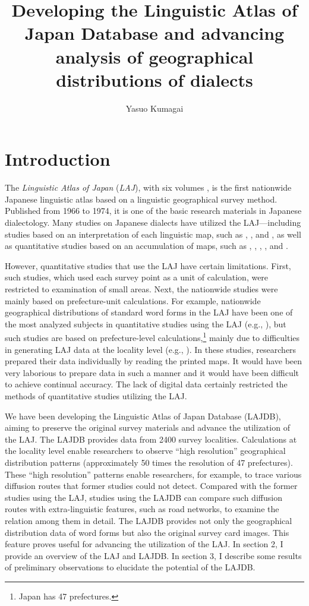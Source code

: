 \documentclass[output=paper]{LSP/langsci}
\author{Yasuo Kumagai\affiliation{National Institute for Japanese Language and Linguistics, NINJAL} }
\title{Developing the Linguistic Atlas of Japan Database and advancing analysis of geographical distributions of dialects}
\begin{document}
  




% 
 

\section{Introduction}
The \textit{Linguistic Atlas of Japan} (\textit{LAJ}), with six volumes \citep{kokuritsu_kokugo_kenkyujo_nlri_nihon_1966-1}, is the first nationwide Japanese linguistic atlas based on a linguistic geographical survey method. Published from 1966 to 1974, it is one of the basic research materials in Japanese dialectology. Many studies on Japanese dialects have utilized the LAJ—including studies based on an interpretation of each linguistic map, such as \citet{sato_chiikishakai_1986}, \citet{tokugawa_hogenchirigaku_1993}, and \citet{kobayashi_hogengakuteki_2004}, as well as quantitative studies based on an accumulation of maps, such as \citet{takada_kotoba_1969}, \citet{hondo_gendai_1980}, \citet{kasai_hyojun_1981}, \citet{ichii_hogen_1993}, and \citet{inoue_keiryoteki_2001}. 

However, quantitative studies that use the LAJ have certain limitations. First, such studies, which used each survey point as a unit of calculation, were restricted to examination of small areas. Next, the nationwide studies were mainly based on prefecture-unit calculations. For example, nationwide geographical distributions of standard word forms in the LAJ have been one of the most analyzed subjects in quantitative studies using the LAJ (e.g., \citealt{inoue_keiryoteki_2001}), but such studies are based on prefecture-level calculations,\footnote{Japan has 47 prefectures.} mainly due to difficulties in generating LAJ data at the locality level (e.g., \citealt[485, 498]{hondo_gendai_1980}). In these studies, researchers prepared their data individually by reading the printed maps. It would have been very laborious to prepare data in such a manner and it would have been difficult to achieve continual accuracy. The lack of digital data certainly restricted the methods of quantitative studies utilizing the LAJ.

We have been developing the Linguistic Atlas of Japan Database (LAJDB), aiming to preserve the original survey materials and advance the utilization of the LAJ. The LAJDB provides data from 2400 survey localities. Calculations at the locality level enable researchers to observe “high resolution” geographical distribution patterns (approximately 50 times the resolution of 47 prefectures). These “high resolution” patterns enable researchers, for example, to trace various diffusion routes that former studies could not detect. Compared with the former studies using the LAJ, studies using the LAJDB can compare such diffusion routes with extra-linguistic features, such as road networks, to examine the relation among them in detail. The LAJDB provides not only the geographical distribution data of word forms but also the original survey card images. This feature proves useful for advancing the utilization of the LAJ. In section 2, I provide an overview of the LAJ and LAJDB. In section 3, I describe some results of preliminary observations to elucidate the potential of the LAJDB. 
\end{document}
